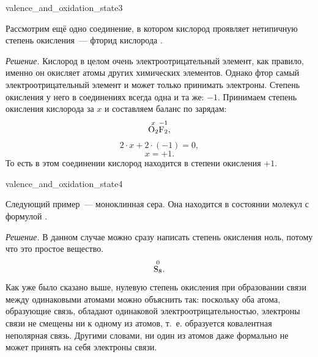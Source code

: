 \begin{example}{}{valence_and_oxidation_state3}
    \begin{condition}
        Рассмотрим ещё одно соединение, в котором кислород проявляет нетипичную степень окисления~--- фторид кислорода .
    \end{condition}

    \medskip

    \textit{Решение.} Кислород в целом очень электроотрицательный элемент, как правило, именно он окисляет атомы других химических элементов. Однако фтор самый электроотрицательный элемент и может только принимать электроны. Степень окисления у него в соединениях всегда одна и та же: $-1$. Принимаем степень окисления кислорода за $x$ и составляем баланс по зарядам:
    \begin{equation*}
        \overset{x}{\ce{O2}}\overset{-1}{\ce{F2}},
    \end{equation*}
    \begin{equation*}
        2 \cdot x + 2 \cdot (-1) = 0,
    \end{equation*}
    \begin{equation*}
        x = +1.
    \end{equation*}
    То есть в этом соединении кислород находится в степени окисления $+1$.
\end{example}

\begin{example}{}{valence_and_oxidation_state4}
    \begin{condition}
        Следующий пример~--- моноклинная сера. Она находится в состоянии молекул с формулой .
    \end{condition}

    \medskip

    \textit{Решение.} В данном случае можно сразу написать степень окисления ноль, потому что это простое вещество.
    \begin{equation*}
        \overset{0}{\ce{S8}}.
    \end{equation*}
    Как уже было сказано выше, нулевую степень окисления при образовании связи между одинаковыми атомами можно объяснить так: поскольку оба атома, образующие связь, обладают одинаковой электроотрицательностью, электроны связи не смещены ни к одному из атомов, т.~е. образуется ковалентная неполярная связь. Другими словами, ни один из атомов даже формально не может принять на себя электроны связи.
\end{example}

